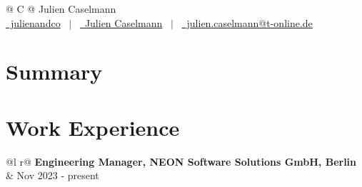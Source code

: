 \documentclass[a4paper,12pt]{article}
\begin{document}
\pagestyle{empty} 



\begin{tabularx}{\linewidth}{@{} C @{}}
\Huge{Julien Caselmann} \\[7.5pt]
\href{https://github.com/julienandco}{\raisebox{-0.05\height}\faGithub\ julienandco} \ $|$ \ 
\href{https://www.linkedin.com/in/julien-caselmann-761a2b177/}{\raisebox{-0.05\height}\faLinkedin\ Julien Caselmann} \ $|$ \ 
\href{mailto:julien.caselmann@t-online.de}{\raisebox{-0.05\height}\faEnvelope \ julien.caselmann@t-online.de} \ 
\end{tabularx}


\section{Summary}


\section{Work Experience}

\begin{tabularx}{\linewidth}{ @{}l r@{} }
\textbf{Engineering Manager, NEON Software Solutions GmbH, Berlin} & \hfill Nov 2023 - present \\[3.75pt]
  \\
\end{tabularx}
\end{document}
